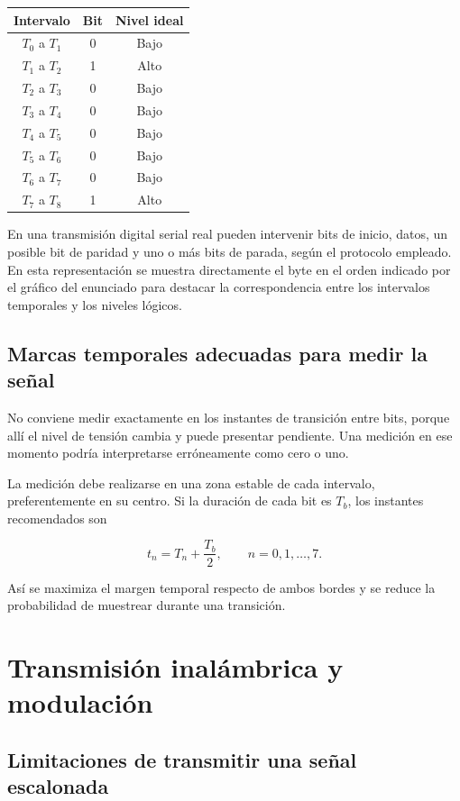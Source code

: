 ﻿\documentclass[12pt,a4paper]{article}
\begin{document}
\begin{table}[H]
\centering
\begin{tabular}{ccc}
\toprule
Intervalo & Bit & Nivel ideal \\
\midrule
$T_0$ a $T_1$ & 0 & Bajo \\
$T_1$ a $T_2$ & 1 & Alto \\
$T_2$ a $T_3$ & 0 & Bajo \\
$T_3$ a $T_4$ & 0 & Bajo \\
$T_4$ a $T_5$ & 0 & Bajo \\
$T_5$ a $T_6$ & 0 & Bajo \\
$T_6$ a $T_7$ & 0 & Bajo \\
$T_7$ a $T_8$ & 1 & Alto \\
\bottomrule
\end{tabular}
\end{table}

En una transmisión digital serial real pueden intervenir bits de inicio, datos,
un posible bit de paridad y uno o más bits de parada, según el protocolo
empleado. En esta representación se muestra directamente el byte en el orden
indicado por el gráfico del enunciado para destacar la correspondencia entre
los intervalos temporales y los niveles lógicos.

\subsection{Marcas temporales adecuadas para medir la señal}

No conviene medir exactamente en los instantes de transición entre bits, porque
allí el nivel de tensión cambia y puede presentar pendiente. Una medición en ese
momento podría interpretarse erróneamente como cero o uno.

La medición debe realizarse en una zona estable de cada intervalo,
preferentemente en su centro. Si la duración de cada bit es $T_b$, los instantes
recomendados son

\[
t_n=T_n+\frac{T_b}{2},\qquad n=0,1,\ldots,7.
\]

Así se maximiza el margen temporal respecto de ambos bordes y se reduce la
probabilidad de muestrear durante una transición.

\section{Transmisión inalámbrica y modulación}

\subsection{Limitaciones de transmitir una señal escalonada}
\end{document}
